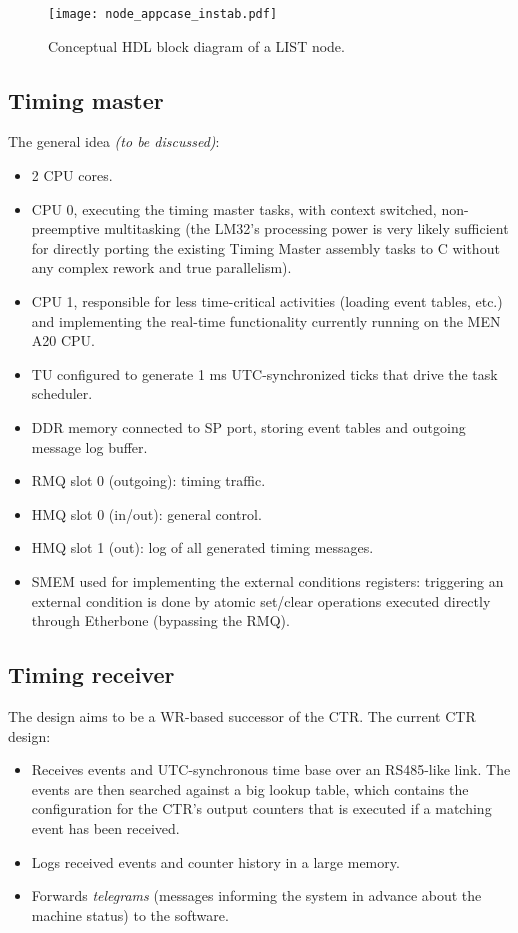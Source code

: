 \documentclass{article}
\begin{document}
\begin{figure}[htb]
\centering
\texttt{[image: node\_appcase\_instab.pdf]}
\caption{Conceptual HDL block diagram of a LIST node.}
\label{fig:list_node_block}
\end{figure}

\subsection{Timing master}

The general idea \textit{(to be discussed)}:
\begin{itemize}
\item 2 CPU cores.
\item CPU 0, executing the timing master tasks, with context switched, non-preemptive multitasking (the LM32's processing power is very likely sufficient for directly porting the existing Timing Master assembly tasks to C without any complex rework and true parallelism).
\item CPU 1, responsible for less time-critical activities (loading event tables, etc.) and implementing the real-time functionality currently running on the MEN A20 CPU.
\item TU configured to generate 1 ms UTC-synchronized ticks that drive the task scheduler.
\item DDR memory connected to SP port, storing event tables and outgoing message log buffer.
\item RMQ slot 0 (outgoing): timing traffic.
\item HMQ slot 0 (in/out): general control.
\item HMQ slot 1 (out): log of all generated timing messages.
\item SMEM used for implementing the external conditions registers: triggering an external condition is done by atomic set/clear operations executed directly through Etherbone (bypassing the RMQ).
\end{itemize}

\subsection{Timing receiver}

The design aims to be a WR-based successor of the CTR. The current CTR design:
\begin{itemize}
\item Receives events and UTC-synchronous time base over an RS485-like link. The events are then searched against a big lookup table, which contains the configuration for the CTR's output counters that is executed if a matching event has been received. 
\item Logs received events and counter history in a large memory.
\item Forwards \textit{telegrams} (messages informing the system in advance about the machine status) to the software.
\end{itemize}
\end{document}
